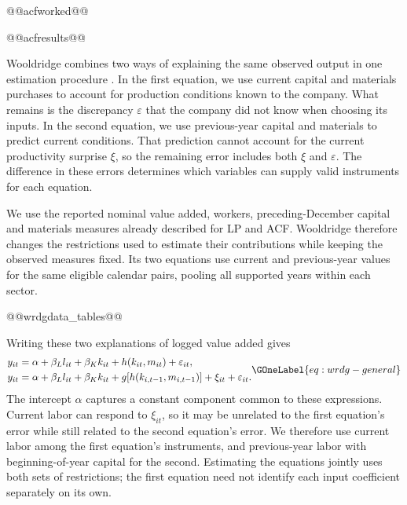 @@acfworked@@

@@acfresults@@

Wooldridge combines two ways of explaining the same observed output in one estimation procedure \citep{wooldridge}. In the first equation, we use current capital and materials purchases to account for production conditions known to the company. What remains is the discrepancy $\varepsilon$ that the company did not know when choosing its inputs. In the second equation, we use previous-year capital and materials to predict current conditions. That prediction cannot account for the current productivity surprise $\xi$, so the remaining error includes both $\xi$ and $\varepsilon$. The difference in these errors determines which variables can supply valid instruments for each equation.

We use the reported nominal value added, workers, preceding-December capital and materials measures already described for LP and ACF. Wooldridge therefore changes the restrictions used to estimate their contributions while keeping the observed measures fixed. Its two equations use current and previous-year values for the same eligible calendar pairs, pooling all supported years within each sector.

@@wrdgdata_tables@@

Writing these two explanations of logged value added gives
\begin{equation}
\begin{aligned}
y_{it}&=\alpha+\beta_Ll_{it}+\beta_Kk_{it}+h(k_{it},m_{it})+\varepsilon_{it},\\
y_{it}&=\alpha+\beta_Ll_{it}+\beta_Kk_{it}+g\!\left[h(k_{i,t-1},m_{i,t-1})\right]+\xi_{it}+\varepsilon_{it}.
\end{aligned}
\GOneLabel{eq:wrdg-general}
\end{equation}
The intercept $\alpha$ captures a constant component common to these expressions. Current labor can respond to $\xi_{it}$, so it may be unrelated to the first equation's error while still related to the second equation's error. We therefore use current labor among the first equation's instruments, and previous-year labor with beginning-of-year capital for the second. Estimating the equations jointly uses both sets of restrictions; the first equation need not identify each input coefficient separately on its own.


